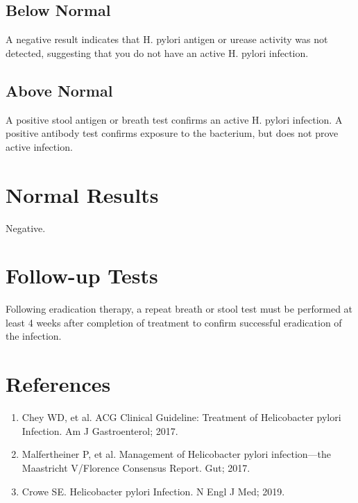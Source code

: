 \subsection*{Below Normal}
A negative result indicates that H. pylori antigen or urease activity was not detected, suggesting that you do not have an active H. pylori infection.

\subsection*{Above Normal}
A positive stool antigen or breath test confirms an active H. pylori infection. A positive antibody test confirms exposure to the bacterium, but does not prove active infection.

\section*{Normal Results}
Negative.

\section*{Follow-up Tests}
Following eradication therapy, a repeat breath or stool test must be performed at least 4 weeks after completion of treatment to confirm successful eradication of the infection.

\section*{References}
\begin{enumerate}
  \item Chey WD, et al. ACG Clinical Guideline: Treatment of Helicobacter pylori Infection. Am J Gastroenterol; 2017.
  \item Malfertheiner P, et al. Management of Helicobacter pylori infection---the Maastricht V/Florence Consensus Report. Gut; 2017.
  \item Crowe SE. Helicobacter pylori Infection. N Engl J Med; 2019.
\end{enumerate}

\clearpage
